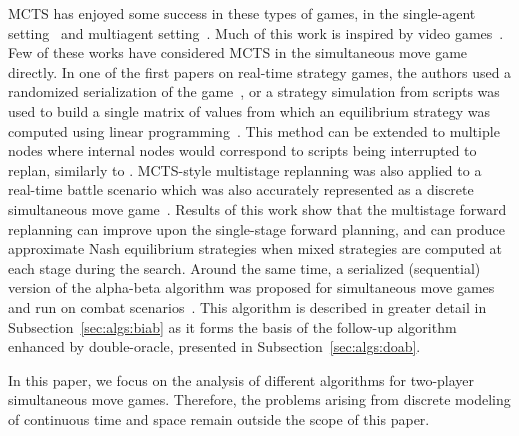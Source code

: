 MCTS has enjoyed some success in these types of games, in the single-agent 
setting~\cite{Pepels14Monte,Perez14PTSP} and multiagent setting~\cite{Balla09UCT}. Much of this work is inspired by video 
games~\cite{Cowling13Video,BellemareNVB13,Ontanon13RTSSurvey}. Few of these works have considered MCTS
in the simultaneous move game directly. 
In one of the first papers on real-time strategy games, the authors used a randomized serialization 
of the game~\cite{kovarsky2005heuristic}, or a strategy simulation
from scripts was used to build a single matrix of values from which an equilibrium strategy was 
computed using linear programming~\cite{Sailor07adversarial}.  
This method can be extended to multiple nodes where internal nodes would correspond to scripts being interrupted to replan, similarly to \cite{lisy2009gbgts}.
MCTS-style multistage replanning was also applied to a real-time battle scenario which was also accurately
represented as a discrete simultaneous move game~\cite{Beard12Using}. Results of this work show that the multistage
forward replanning can improve upon the single-stage forward planning, and can produce approximate Nash equilibrium strategies
when mixed strategies are computed at each stage during the search.
Around the same time, a serialized (sequential) version of the alpha-beta algorithm was proposed for simultaneous move games 
and run on combat scenarios~\cite{Churchill2012Fast}. This algorithm is described in greater detail in
Subsection~\ref{sec:algs:biab} as it forms the basis of the follow-up algorithm enhanced by
double-oracle, presented in Subsection~\ref{sec:algs:doab}.

In this paper, we focus on the analysis of different algorithms for two-player simultaneous move games. Therefore, 
the problems arising from discrete modeling of continuous time and space remain outside the scope of this paper.






